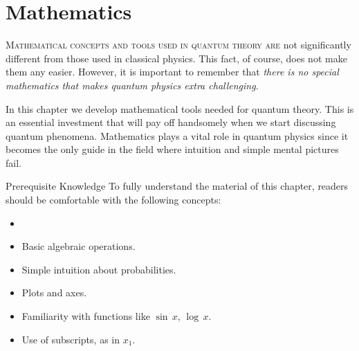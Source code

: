 \graphicspath{{../03Mathematics/pics/}}

\chapter{Mathematics}\label{ch:Mathematics}

\lettrine[lines=2]{\color{darkocre}M}{athematical concepts and tools used in quantum theory are} not significantly different from those used in classical physics. This fact, of course, does not make them any easier. However, it is important to remember that \emph{there is no special mathematics that makes quantum physics extra challenging}.

In this chapter we develop mathematical tools needed for quantum theory. This is an essential investment that will pay off handsomely when we start discussing quantum phenomena. Mathematics plays a vital role in quantum physics since it becomes the only guide in the field where intuition and simple mental pictures fail.

\begin{myprereq}{Prerequisite Knowledge}
	To fully understand the material of this chapter, readers should be comfortable with the following concepts:
	
	\begin{itemize}
		\item \phantom{phantom}
		\vspace{-0.5cm}
		\item Basic algebraic operations.
		\item Simple intuition about probabilities.
		\item Plots and axes.
		\item Familiarity with functions like $\sin\, x$, $\log\, x$.
		\item Use of subscripts, as in $x_1$.
	\end{itemize}	
\end{myprereq}

\newpage
